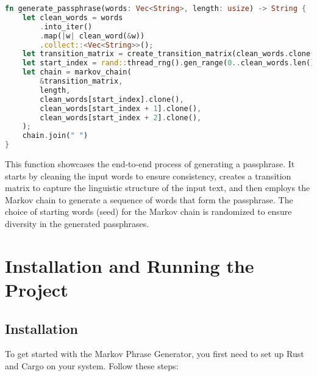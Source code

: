 \documentclass[a4paper,12pt]{article}
\begin{document}
\begin{lstlisting}[language=Rust, caption={Generating the Passphrase}]
fn generate_passphrase(words: Vec<String>, length: usize) -> String {
    let clean_words = words
        .into_iter()
        .map(|w| clean_word(&w))
        .collect::<Vec<String>>();
    let transition_matrix = create_transition_matrix(clean_words.clone());
    let start_index = rand::thread_rng().gen_range(0..clean_words.len() - 3);
    let chain = markov_chain(
        &transition_matrix,
        length,
        clean_words[start_index].clone(),
        clean_words[start_index + 1].clone(),
        clean_words[start_index + 2].clone(),
    );
    chain.join(" ")
}
\end{lstlisting}

This function showcases the end-to-end process of generating a passphrase. It starts by cleaning the input words to ensure consistency, creates a transition matrix to capture the linguistic structure of the input text, and then employs the Markov chain to generate a sequence of words that form the passphrase. The choice of starting words (seed) for the Markov chain is randomized to ensure diversity in the generated passphrases.

\section{Installation and Running the Project}

\subsection{Installation}

To get started with the Markov Phrase Generator, you first need to set up Rust and Cargo on your system. Follow these steps:
\end{document}
